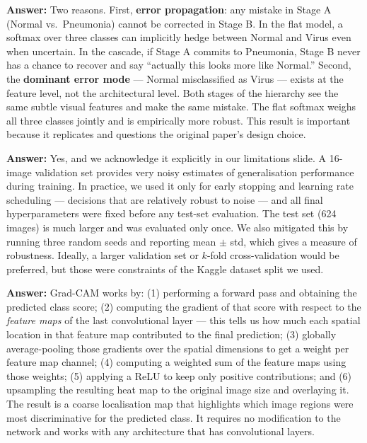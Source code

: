 \documentclass[12pt,a4paper]{article}
\begin{document}
\begin{tcolorbox}[qabox={Q4 — Why did the hierarchical classifier not improve over the flat softmax?}]
\textbf{Answer:} Two reasons. First, \textbf{error propagation}: any mistake in Stage A (Normal vs.\ Pneumonia) cannot be corrected in Stage B. In the flat model, a softmax over three classes can implicitly hedge between Normal and Virus even when uncertain. In the cascade, if Stage A commits to Pneumonia, Stage B never has a chance to recover and say ``actually this looks more like Normal.'' Second, the \textbf{dominant error mode} --- Normal misclassified as Virus --- exists at the feature level, not the architectural level. Both stages of the hierarchy see the same subtle visual features and make the same mistake. The flat softmax weighs all three classes jointly and is empirically more robust. This result is important because it replicates and questions the original paper's design choice.
\end{tcolorbox}

\begin{tcolorbox}[qabox={Q5 — The validation set has only 16 images. Is that a concern?}]
\textbf{Answer:} Yes, and we acknowledge it explicitly in our limitations slide. A 16-image validation set provides very noisy estimates of generalisation performance during training. In practice, we used it only for early stopping and learning rate scheduling --- decisions that are relatively robust to noise --- and all final hyperparameters were fixed before any test-set evaluation. The test set (624 images) is much larger and was evaluated only once. We also mitigated this by running three random seeds and reporting mean $\pm$ std, which gives a measure of robustness. Ideally, a larger validation set or $k$-fold cross-validation would be preferred, but those were constraints of the Kaggle dataset split we used.
\end{tcolorbox}

\begin{tcolorbox}[qabox={Q6 — How does Grad-CAM actually work technically?}]
\textbf{Answer:} Grad-CAM works by: (1) performing a forward pass and obtaining the predicted class score; (2) computing the gradient of that score with respect to the \emph{feature maps} of the last convolutional layer --- this tells us how much each spatial location in that feature map contributed to the final prediction; (3) globally average-pooling those gradients over the spatial dimensions to get a weight per feature map channel; (4) computing a weighted sum of the feature maps using those weights; (5) applying a ReLU to keep only positive contributions; and (6) upsampling the resulting heat map to the original image size and overlaying it. The result is a coarse localisation map that highlights which image regions were most discriminative for the predicted class. It requires no modification to the network and works with any architecture that has convolutional layers.
\end{tcolorbox}
\end{document}
